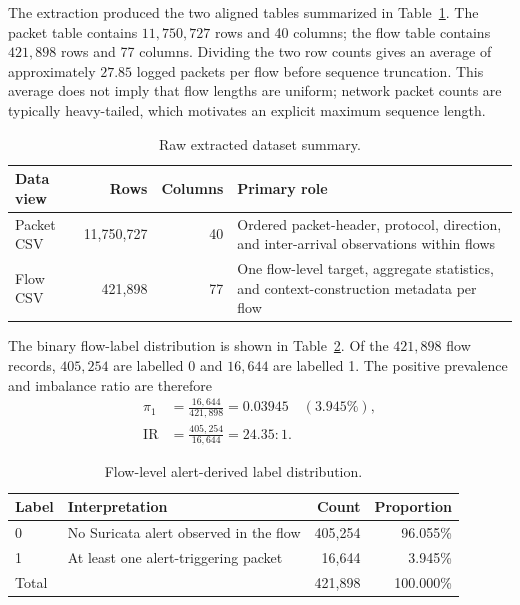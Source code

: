 \documentclass[11pt,fleqn]{report}
\begin{document}
The extraction produced the two aligned tables summarized in
Table~\ref{tab:raw_dataset_summary}. The packet table contains
$11{,}750{,}727$ rows and 40 columns; the flow table contains $421{,}898$ rows
and 77 columns. Dividing the two row counts gives an average of approximately
$27.85$ logged packets per flow before sequence truncation. This average does
not imply that flow lengths are uniform; network packet counts are typically
heavy-tailed, which motivates an explicit maximum sequence length.

\begin{table}[H]
    \centering
    \caption{Raw extracted dataset summary.}
    \label{tab:raw_dataset_summary}
    \begin{tabular}{@{}lrrp{5.7cm}@{}}
        \toprule
        Data view & Rows & Columns & Primary role \\
        \midrule
        Packet CSV & 11,750,727 & 40 & Ordered packet-header, protocol,
        direction, and inter-arrival observations within flows \\
        Flow CSV & 421,898 & 77 & One flow-level target, aggregate
        statistics, and context-construction metadata per flow \\
        \bottomrule
    \end{tabular}
\end{table}

The binary flow-label distribution is shown in
Table~\ref{tab:flow_label_distribution}. Of the $421{,}898$ flow records,
$405{,}254$ are labelled 0 and $16{,}644$ are labelled 1. The positive
prevalence and imbalance ratio are therefore
\begin{align}
    \pi_1 &= \frac{16{,}644}{421{,}898} = 0.03945
             \quad (3.945\%), \\
    \mathrm{IR} &= \frac{405{,}254}{16{,}644} = 24.35:1.
    \label{eq:dataset_imbalance}
\end{align}

\begin{table}[H]
    \centering
    \caption{Flow-level alert-derived label distribution.}
    \label{tab:flow_label_distribution}
    \begin{tabular}{@{}llrr@{}}
        \toprule
        Label & Interpretation & Count & Proportion \\
        \midrule
        0 & No Suricata alert observed in the flow & 405,254 & 96.055\% \\
        1 & At least one alert-triggering packet & 16,644 & 3.945\% \\
        \midrule
        Total & & 421,898 & 100.000\% \\
        \bottomrule
    \end{tabular}
\end{table}
\end{document}
